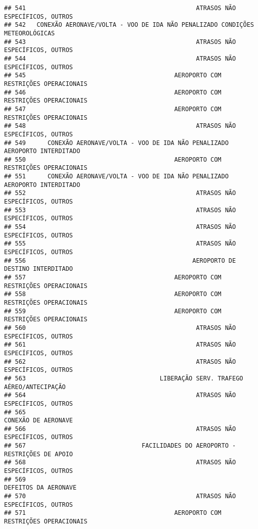 \documentclass[
]{article}
\begin{document}
\begin{verbatim}
## 541                                               ATRASOS NÃO ESPECÍFICOS, OUTROS
## 542   CONEXÃO AERONAVE/VOLTA - VOO DE IDA NÃO PENALIZADO CONDIÇÕES METEOROLÓGICAS
## 543                                               ATRASOS NÃO ESPECÍFICOS, OUTROS
## 544                                               ATRASOS NÃO ESPECÍFICOS, OUTROS
## 545                                         AEROPORTO COM RESTRIÇÕES OPERACIONAIS
## 546                                         AEROPORTO COM RESTRIÇÕES OPERACIONAIS
## 547                                         AEROPORTO COM RESTRIÇÕES OPERACIONAIS
## 548                                               ATRASOS NÃO ESPECÍFICOS, OUTROS
## 549      CONEXÃO AERONAVE/VOLTA - VOO DE IDA NÃO PENALIZADO AEROPORTO INTERDITADO
## 550                                         AEROPORTO COM RESTRIÇÕES OPERACIONAIS
## 551      CONEXÃO AERONAVE/VOLTA - VOO DE IDA NÃO PENALIZADO AEROPORTO INTERDITADO
## 552                                               ATRASOS NÃO ESPECÍFICOS, OUTROS
## 553                                               ATRASOS NÃO ESPECÍFICOS, OUTROS
## 554                                               ATRASOS NÃO ESPECÍFICOS, OUTROS
## 555                                               ATRASOS NÃO ESPECÍFICOS, OUTROS
## 556                                              AEROPORTO DE DESTINO INTERDITADO
## 557                                         AEROPORTO COM RESTRIÇÕES OPERACIONAIS
## 558                                         AEROPORTO COM RESTRIÇÕES OPERACIONAIS
## 559                                         AEROPORTO COM RESTRIÇÕES OPERACIONAIS
## 560                                               ATRASOS NÃO ESPECÍFICOS, OUTROS
## 561                                               ATRASOS NÃO ESPECÍFICOS, OUTROS
## 562                                               ATRASOS NÃO ESPECÍFICOS, OUTROS
## 563                                     LIBERAÇÃO SERV. TRAFEGO AÉREO/ANTECIPAÇÃO
## 564                                               ATRASOS NÃO ESPECÍFICOS, OUTROS
## 565                                                           CONEXÃO DE AERONAVE
## 566                                               ATRASOS NÃO ESPECÍFICOS, OUTROS
## 567                                FACILIDADES DO AEROPORTO - RESTRIÇÕES DE APOIO
## 568                                               ATRASOS NÃO ESPECÍFICOS, OUTROS
## 569                                                          DEFEITOS DA AERONAVE
## 570                                               ATRASOS NÃO ESPECÍFICOS, OUTROS
## 571                                         AEROPORTO COM RESTRIÇÕES OPERACIONAIS

\end{verbatim}
\end{document}
